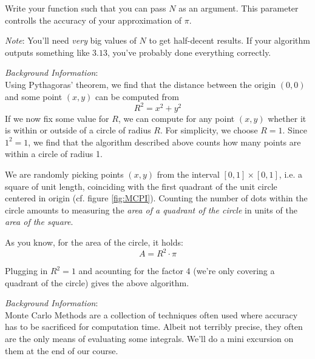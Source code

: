 \documentclass[
	english,
	fontsize=10pt,
	parskip=half,
	titlepage=true,
	DIV=12
]{scrartcl}
\newcommand*{\ie}{i.\;e. }
\begin{document}
Write your function such that you can pass $N$ as an argument. This parameter controlls the accuracy of your approximation of $\pi$.

\emph{Note}: You'll need \emph{very} big values of $N$ to get half-decent results. If your algorithm outputs something like $3.13$, you've probably done everything correctly.

\emph{Background Information}:\\
Using Pythagoras' theorem, we find that the distance between the origin $(0, 0)$ and some point $(x, y)$ can be computed from
\[ R^2 = x^2 + y^2 \]
If we now fix some value for $R$, we can compute for any point $(x, y)$ whether it is within or outside of a circle of radius $R$. For simplicity, we choose $R = 1$. Since $1^2 = 1$, we find that the algorithm described above counts how many points are within a circle of radius 1.

We are randomly picking points $(x, y)$ from the interval $[0, 1] \times [0, 1]$, \ie a square of unit length, coinciding with the first quadrant of the unit circle centered in origin (cf. figure \ref{fig:MCPI}). Counting the number of dots within the circle amounts to measuring the \emph{area of a quadrant of the circle} in units of the \emph{area of the square}.

As you know, for the area of the circle, it holds:
\[ A = R^2 \cdot \pi \]

Plugging in $R^2 = 1$ and acounting for the factor 4 (we're only covering a quadrant of the circle) gives the above algorithm.

\emph{Background Information}:\\
Monte Carlo Methods are a collection of techniques often used where accuracy has to be sacrificed for computation time. Albeit not terribly precise, they often are the only means of evaluating some integrals. We'll do a mini excursion on them at the end of our course.
\end{document}
